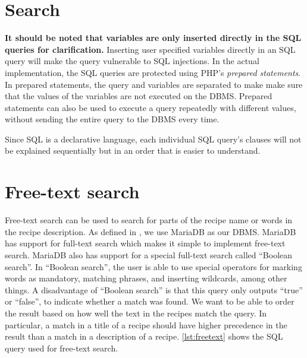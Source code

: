 \section{Search}
\textbf{It should be noted that variables are only inserted directly in the SQL queries for clarification.} Inserting user specified variables directly in an SQL query will make the query vulnerable to SQL injections. In the actual implementation, the SQL queries are protected using PHP's \textit{prepared statements}. In prepared statements, the query and variables are separated to make make sure that the values of the variables are not executed on the DBMS. Prepared statements can also be used to execute a query repeatedly with different values, without sending the entire query to the DBMS every time.

Since SQL is a declarative language, each individual SQL query's clauses will not be explained sequentially but in an order that is easier to understand.



\section{Free-text search}
Free-text search can be used to search for parts of the recipe name or words in the recipe description. As defined in , we use MariaDB as our DBMS. MariaDB has support for full-text search which makes it simple to implement free-text search. MariaDB also has support for a special full-text search called ``Boolean search''. In ``Boolean search'', the user is able to use special operators for marking words as mandatory, matching phrases, and inserting wildcards, among other things. A disadvantage of ``Boolean search'' is that this query only outputs ``true'' or ``false'', to indicate whether a match was found. We want to be able to order the result based on how well the text in the recipes match the query. In particular, a match in a title of a recipe should have higher precedence in the result than a match in a description of a recipe.
\autoref{lst:freetext} shows the SQL query used for free-text search.

